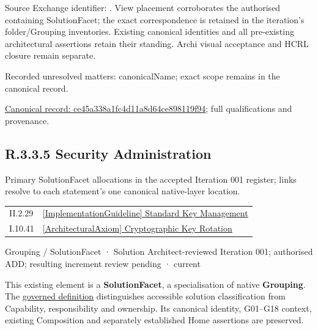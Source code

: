 Source Exchange identifier: \texttt{}. View placement corroborates
the authorised containing SolutionFacet; the exact correspondence is retained in the
iteration's folder/Grouping inventories. Existing canonical identities and all
pre-existing architectural assertions retain their standing. Archi visual
acceptance and HCRL closure remain separate.


{\small Recorded unresolved matters: canonicalName; exact scope remains in the canonical record.}\par
{\footnotesize \href{../../../../../../../continuum/grouping/ce45a338a1fc4d11a8d64ce898119f94.md}{Canonical record: ce45a338a1fc4d11a8d64ce898119f94}; full qualifications and provenance.}\par
\subsection*{R.3.3.5 Security Administration}
\label{navigation:R.3.3.5}

Primary SolutionFacet allocations in the accepted Iteration 001 register; links resolve to each statement’s one canonical native-layer location.\par
\begin{longtable}{p{.22\linewidth}p{.73\linewidth}}
II.2.29 & \hyperref[element:bbedb1ff13e94a88ac7ec60b8e40092e]{[ImplementationGuideline] Standard Key Management} \\
I.10.41 & \hyperref[element:6df99d4979a942fe833e1c43317b385b]{[ArchitecturalAxiom] Cryptographic Key Rotation} \\
\end{longtable}
\label{element:84693ef7bb4a4ced9634737c6bd5a36d}
{\small Grouping / SolutionFacet · Solution Architect-reviewed Iteration 001; authorised ADD; resulting increment review pending · current}\par

This existing element is a \textbf{SolutionFacet}, a specialisation of native
\textbf{Grouping}. The \href{\detokenize{../../../../../../../governance/continuum-representation.md#solutionfacet-classification--1119-candidate}}{governed definition}
distinguishes accessible solution classification from Capability, responsibility
and ownership. Its canonical identity, G01–G18 context, existing Composition
and separately established Home assertions are preserved.



